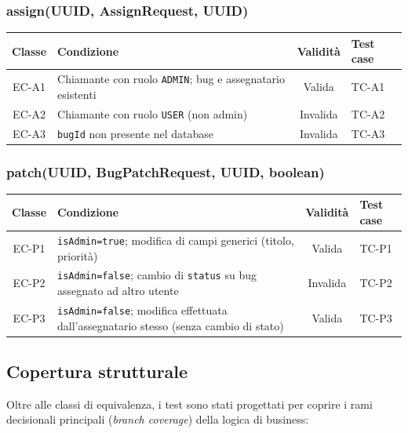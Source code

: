 \subsubsection{assign(UUID, AssignRequest, UUID)}

\begin{center}
\small
\begin{tabular}{|c|p{5.5cm}|c|p{4.5cm}|}
\hline
\textbf{Classe} & \textbf{Condizione} & \textbf{Validità} & \textbf{Test case} \\
\hline
EC-A1 & Chiamante con ruolo \texttt{ADMIN}; bug e assegnatario esistenti & Valida & TC-A1 \\
\hline
EC-A2 & Chiamante con ruolo \texttt{USER} (non admin) & Invalida & TC-A2 \\
\hline
EC-A3 & \texttt{bugId} non presente nel database & Invalida & TC-A3 \\
\hline
\end{tabular}
\end{center}

\subsubsection{patch(UUID, BugPatchRequest, UUID, boolean)}

\begin{center}
\small
\begin{tabular}{|c|p{5.5cm}|c|p{4.5cm}|}
\hline
\textbf{Classe} & \textbf{Condizione} & \textbf{Validità} & \textbf{Test case} \\
\hline
EC-P1 & \texttt{isAdmin=true}; modifica di campi generici (titolo, priorità) & Valida & TC-P1 \\
\hline
EC-P2 & \texttt{isAdmin=false}; cambio di \texttt{status} su bug assegnato ad altro utente & Invalida & TC-P2 \\
\hline
EC-P3 & \texttt{isAdmin=false}; modifica effettuata dall'assegnatario stesso (senza cambio di stato) & Valida & TC-P3 \\
\hline
\end{tabular}
\end{center}

\subsection{Copertura strutturale}

Oltre alle classi di equivalenza, i test sono stati progettati per coprire
i rami decisionali principali (\emph{branch coverage}) della logica di
business:


